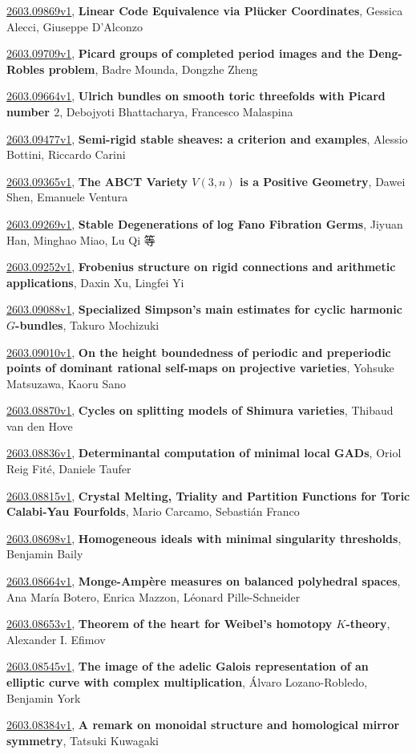 \documentclass[9pt, a4paper]{article}
\theoremstyle{plain}
\theoremstyle{definition}
\theoremstyle{remark}
\newcommand{\arxiv}[3]{\href{https://arxiv.org/abs/#1}{#1}, \textbf{\textcolor{arxivblue}{#2}}, #3}
\begin{document}
\arxiv{2603.09869v1}{Linear Code Equivalence via Plücker Coordinates}{Gessica Alecci, Giuseppe D'Alconzo}

\arxiv{2603.09709v1}{Picard groups of completed period images and the Deng-Robles problem}{Badre Mounda, Dongzhe Zheng}

\arxiv{2603.09664v1}{Ulrich bundles on smooth toric threefolds with Picard number $2$}{Debojyoti Bhattacharya, Francesco Malaspina}

\arxiv{2603.09477v1}{Semi-rigid stable sheaves: a criterion and examples}{Alessio Bottini, Riccardo Carini}

\arxiv{2603.09365v1}{The ABCT Variety $V(3,n)$ is a Positive Geometry}{Dawei Shen, Emanuele Ventura}

\arxiv{2603.09269v1}{Stable Degenerations of log Fano Fibration Germs}{Jiyuan Han, Minghao Miao, Lu Qi 等}

\arxiv{2603.09252v1}{Frobenius structure on rigid connections and arithmetic applications}{Daxin Xu, Lingfei Yi}

\arxiv{2603.09088v1}{Specialized Simpson's main estimates for cyclic harmonic $G$-bundles}{Takuro Mochizuki}

\arxiv{2603.09010v1}{On the height boundedness of periodic and preperiodic points of dominant rational self-maps on projective varieties}{Yohsuke Matsuzawa, Kaoru Sano}

\arxiv{2603.08870v1}{Cycles on splitting models of Shimura varieties}{Thibaud van den Hove}

\arxiv{2603.08836v1}{Determinantal computation of minimal local GADs}{Oriol Reig Fité, Daniele Taufer}

\arxiv{2603.08815v1}{Crystal Melting, Triality and Partition Functions for Toric Calabi-Yau Fourfolds}{Mario Carcamo, Sebastián Franco}

\arxiv{2603.08698v1}{Homogeneous ideals with minimal singularity thresholds}{Benjamin Baily}

\arxiv{2603.08664v1}{Monge-Ampère measures on balanced polyhedral spaces}{Ana María Botero, Enrica Mazzon, Léonard Pille-Schneider}

\arxiv{2603.08653v1}{Theorem of the heart for Weibel's homotopy $K$-theory}{Alexander I. Efimov}

\arxiv{2603.08545v1}{The image of the adelic Galois representation of an elliptic curve with complex multiplication}{Álvaro Lozano-Robledo, Benjamin York}

\arxiv{2603.08384v1}{A remark on monoidal structure and homological mirror symmetry}{Tatsuki Kuwagaki}
\end{document}
